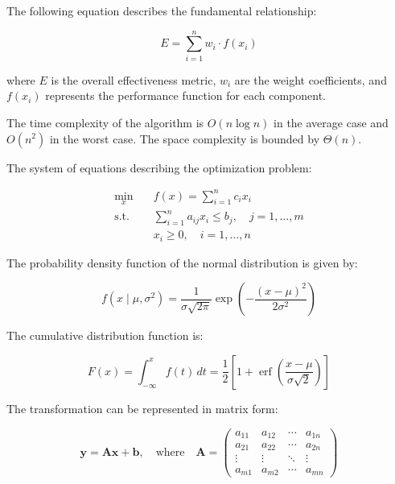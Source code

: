The following equation describes the fundamental relationship:

\begin{equation} \label{eq:basic}
    E = \sum_{i=1}^{n} w_i \cdot f(x_i)
\end{equation}

where $E$ is the overall effectiveness metric, $w_i$ are the weight coefficients, and $f(x_i)$ represents the performance function for each component.

The time complexity of the algorithm is $O(n \log n)$ in the average case and $O(n^2)$ in the worst case.
The space complexity is bounded by $\Theta(n)$.

The system of equations describing the optimization problem:

\begin{align}
    \min_{x} \quad    & f(x) = \sum_{i=1}^{n} c_i x_i \label{eq:objective}                                \\
    \text{s.t.} \quad & \sum_{i=1}^{n} a_{ij} x_i \leq b_j, \quad j = 1, \ldots, m \label{eq:constraint1} \\
                      & x_i \geq 0, \quad i = 1, \ldots, n \label{eq:constraint2}
\end{align}

The probability density function of the normal distribution is given by:

\begin{equation} \label{eq:normal}
    f(x \mid \mu, \sigma^2) = \frac{1}{\sigma\sqrt{2\pi}} \exp\left( -\frac{(x - \mu)^2}{2\sigma^2} \right)
\end{equation}

The cumulative distribution function is:

\begin{equation} \label{eq:cdf}
    F(x) = \int_{-\infty}^{x} f(t) \, dt = \frac{1}{2} \left[ 1 + \operatorname{erf}\left( \frac{x - \mu}{\sigma\sqrt{2}} \right) \right]
\end{equation}

The transformation can be represented in matrix form:

\begin{equation} \label{eq:matrix}
    \mathbf{y} = \mathbf{A} \mathbf{x} + \mathbf{b}, \quad
    \text{where} \quad
    \mathbf{A} = \begin{pmatrix}
        a_{11} & a_{12} & \cdots & a_{1n} \\
        a_{21} & a_{22} & \cdots & a_{2n} \\
        \vdots & \vdots & \ddots & \vdots \\
        a_{m1} & a_{m2} & \cdots & a_{mn}
    \end{pmatrix}
\end{equation}

